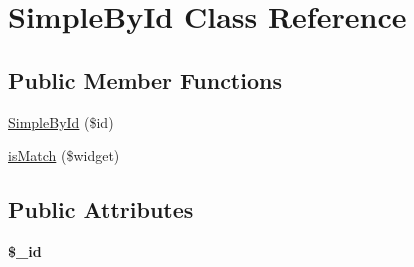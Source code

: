 \hypertarget{class_simple_by_id}{
\section{SimpleById Class Reference}
\label{class_simple_by_id}
}
\subsection*{Public Member Functions}
\begin{DoxyCompactItemize}
\item 
\hyperlink{class_simple_by_id_a46cda17dd142c3627b9faef1ca5b1534}{SimpleById} (\$id)
\item 
\hyperlink{class_simple_by_id_a1a109f5c1be49a1750f584afca647742}{isMatch} (\$widget)
\end{DoxyCompactItemize}
\subsection*{Public Attributes}
\begin{DoxyCompactItemize}
\item 
\hypertarget{class_simple_by_id_a1189b23086cc15f8351d20dc1ac59d47}{
{\bfseries \$\_\-id}}
\label{class_simple_by_id_a1189b23086cc15f8351d20dc1ac59d47}

\end{DoxyCompactItemize}


